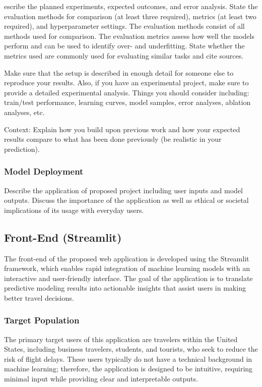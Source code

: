 escribe the planned experiments, expected outcomes, and error analysis. State the evaluation methods for comparison (at least three required), metrics (at least two required), and hyperparameter settings. The evaluation methods consist of all methods used for comparison. The evaluation metrics assess how well the models perform and can be used to identify over- and underfitting. State whether the metrics used are commonly used for evaluating similar tasks and cite sources. 

Make sure that the setup is described in enough detail for someone else to reproduce your results. Also, if you have an experimental project, make sure to provide a detailed experimental analysis. Things you should consider including: train/test performance, learning curves, model samples, error analyses, ablation analyses, etc. 

Context: Explain how you build upon previous work and how your expected results compare to what has been done previously (be realistic in your prediction).


\subsubsection{Model Deployment} 

Describe the application of proposed project including user inputs and model outputs. Discuss the importance of the application as well as ethical or societal implications of its usage with everyday users.

\subsection{Front-End (Streamlit)}

The front-end of the proposed web application is developed using the Streamlit framework, which enables rapid integration of machine learning models with an interactive and user-friendly interface. The goal of the application is to translate predictive modeling results into actionable insights that assist users in making better travel decisions.

\subsubsection{Target Population}

The primary target users of this application are travelers within the United States, including business travelers, students, and tourists, who seek to reduce the risk of flight delays. These users typically do not have a technical background in machine learning; therefore, the application is designed to be intuitive, requiring minimal input while providing clear and interpretable outputs.

